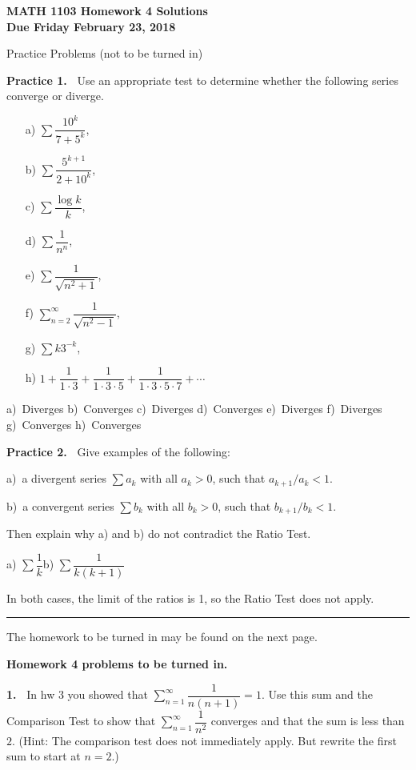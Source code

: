\documentclass[12pt]{article}
\theoremstyle{definition}
\theoremstyle{remark}
\theoremstyle{definition}
\begin{document}
  

{\bf MATH 1103 Homework 4 Solutions}\\
{\bf Due Friday February 23, 2018}

Practice Problems (not to be turned in)

{\bf Practice 1.\ } Use an appropriate test to determine whether the following series converge or diverge.
\begin{enumerate}
\item[a)] $\sum\dfrac{10^k}{7+5^k}$,
\item[b)] $\sum\dfrac{5^{k+1}}{2+10^k}$,
\item[c)] $\sum\dfrac{\log k}{k}$,
\item[d)] $ \sum\dfrac{1}{n^n}$,
\item[e)] $ \sum\dfrac{1}{\sqrt{n^2+1}}$, 
\item[f)] $ \sum_{n=2}^\infty\dfrac{1}{\sqrt{n^2-1}}$, 
\item[g)] $ \sum k 3^{-k}$,
\item[h)] $ 1+\dfrac{1}{1\cdot 3}+\dfrac{1}{1\cdot 3\cdot 5}+\dfrac{1}{1\cdot 3\cdot 5\cdot 7}+\cdots $
\end{enumerate}

a)\ Diverges\quad 
b)\ Converges\quad 
c)\ Diverges\quad 
d)\ Converges\quad 
e)\ Diverges\quad 
f)\ Diverges\quad 
g)\ Converges\quad 
h)\ Converges\quad 

{\bf Practice 2.\ }  Give examples of the following:

a)\ a divergent series $\sum a_k$ with all $a_k>0$, such that $a_{k+1}/a_k< 1$. 

b)\ a  convergent series $\sum b_k$ with all $b_k>0$, such that $b_{k+1}/b_k< 1$. 

Then explain why a) and b)  do not contradict the Ratio Test. 

a) $\sum \dfrac{1}{k}$\quad  b) $\sum \dfrac{1}{k(k+1)}$

In both cases, the limit of the ratios is 1, so the Ratio Test does not apply. 

 \rule{\textwidth}{1pt}
The homework to be turned in may be found on the next page.


\newpage

{\bf Homework 4 problems to be turned in.}

{\bf 1.\ } In hw 3 you showed that $\sum\limits_{n=1}^\infty\dfrac{1}{n(n+1)}=1$. 
Use this sum and the Comparison Test to show that 
$\sum\limits_{n=1}^\infty\dfrac{1}{n^2}$ converges and that the sum is less than $2$. 
(Hint: The comparison test does not immediately apply. But rewrite the first sum to start at $n=2$.)
\end{document}
